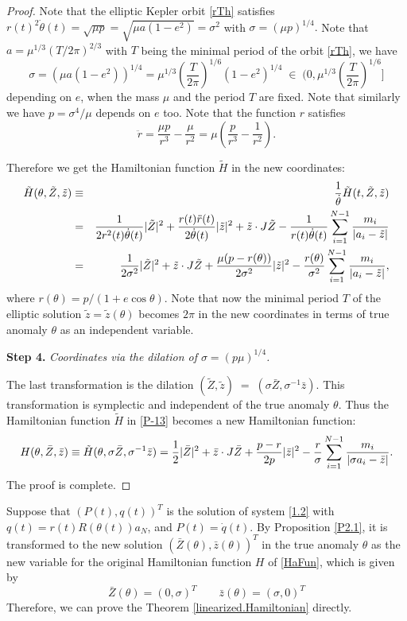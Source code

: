\documentclass[11pt]{article}
\def\be{\begin{equation}}
\def\ee{\end{equation}}
\def\bea{\begin{eqnarray}}
\def\eea{\end{eqnarray}}
\def\nn{\nonumber}
\def\lb{\label}
\def\th{{\theta}}
\def\sg{{\sigma}}
\def\td#1{\tilde{#1}}
\begin{document}
\begin{proof}
  Note that the elliptic Kepler orbit \eqref{rTh} satisfies
  $ r(t)^2\dot{\th}(t) = \sqrt{\mu p} = \sqrt{\mu a(1-e^2)} = \sg^2$ with $\sg=(\mu p)^{1/4}.$
  Note that $a=\mu^{1/3}(T/2\pi)^{2/3}$ with $T$ being the minimal period of the orbit \eqref{rTh}, we have
  $$  \sg = (\mu a(1-e^2))^{1/4} = \mu^{1/3}(\frac{T}{2\pi})^{1/6}(1-e^2)^{1/4}\;\in\; (0,\mu^{1/3}(\frac{T}{2\pi})^{1/6}] $$
  depending on $e$, when the mass $\mu$ and the period $T$ are fixed. Note that similarly we have $p=\sg^4/\mu$ depends
  on $e$ too. Note that the function $r$ satisfies
  $$  \ddot{r} = \frac{\mu p}{r^3} - \frac{\mu}{r^2} = \mu\left(\frac{p}{r^3} - \frac{1}{r^2}\right).  $$
  
  Therefore we get the Hamiltonian function $\td{H}$ in the new coordinates:
  \bea
  \td{H}(\th,\td{Z},\td{z})
       &\equiv& \frac{1}{\dot{\th}}\td{H}(t,\td{Z},\td{z})   \nn\\
  &=& \frac{1}{2r^2(t)\dot{\th}(t)}|\td{Z}|^2
         + \frac{r(t)\ddot{r}(t)}{2\dot{\th}(t)}|\td{z}|^2 
         + \td{z}\cdot J\td{Z}
         - \frac{1}{r(t)\dot{\th}(t)}\sum_{i=1}^{N-1}{m_i\over|a_i-\tilde{z}|}  \nn\\
  &=& \frac{1}{2\sg^2}|\td{Z}|^2+ \td{z}\cdot J\td{Z}
         + \frac{\mu(p-r(\th))}{2\sg^2}|\td{z}|^2
         - \frac{r(\th)}{\sg^2}\sum_{i=1}^{N-1}{m_i\over|a_i-\tilde{z}|},  \lb{P-13}\eea
  where $r(\th)=p/(1+e\cos\th)$. Note that now the minimal period $T$ of the elliptic solution $\td{z}=\td{z}(\th)$
  becomes $2\pi$ in the new coordinates in terms of true anomaly $\th$ as an independent variable.
  
  
  {\bf Step 4.} {\it Coordinates via the dilation of $\sg=(p\mu)^{1/4}$.}
  
  The last transformation is the dilation $(\td{Z},\td{z}) \;=\;
        (\sg\bar{Z},\sg^{-1}\bar{z})$.
  This transformation is symplectic and independent of the true anomaly $\th$. Thus the
  Hamiltonian function $\td{H}$ in \eqref{P-13} becomes a new Hamiltonian function:
  \be
  H(\th,\bar{Z},\bar{z}) \equiv
      \td{H}(\th,\sg\bar{Z},\sg^{-1}\bar{z})  
      = \frac{1}{2}|\bar{Z}|^2 + \bar{z}\cdot J\bar{Z}
        + \frac{p-r}{2p}|\bar{z}|^2
        - \frac{r}{\sg}\sum_{i=1}^{N-1}{m_i\over|\sg a_i-\bar{z}|}.  \lb{P-15}
  \ee
  The proof is complete. 
\end{proof}


Suppose that  $(P(t),q(t))^T$ is the solution of  system \eqref{1.2} with
$
q(t)=r(t)R(\theta(t))a_{N}$, and $P(t)=\dot{q}(t).$
By Proposition  \ref{P2.1}, it is transformed to the new solution $(\bar{Z}(\theta),\bar{z}(\theta))^T$ in the true anomaly $\theta$ as the new
variable for the original Hamiltonian function $H$ of \eqref{HaFun}, which is
given by
\be
\bar{Z}(\theta)
=(0,  \sigma)^T
\qquad
\bar{z}(\theta) = 
(\sigma, 0)^T
\lb{sigma-solution}\ee
Therefore, we can prove the Theorem \ref{linearized.Hamiltonian} directly. 
\end{document}
